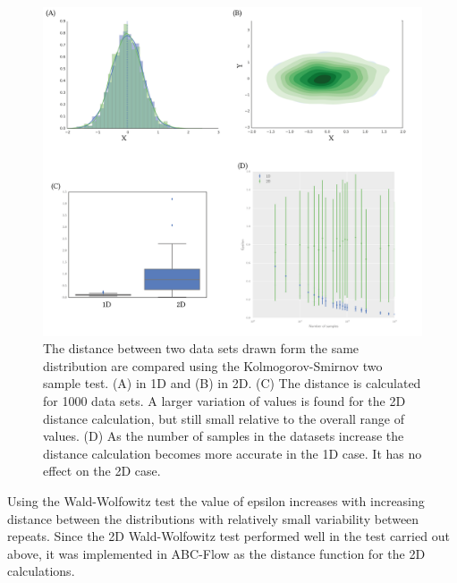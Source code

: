 \begin{figure}[tb]
\centering
\includegraphics[scale=0.7]{../../chapters/chapterABCFlow/images/epsilon_same_box.png}
\caption[LoF caption]{\label{fig:epsilon_boxplt}The distance between two data sets drawn form the same distribution are compared using the Kolmogorov-Smirnov two sample test. (A) in 1D and (B) in 2D. (C) The distance is calculated for 1000 data sets. A larger variation of values is found for the 2D distance calculation, but still small relative to the overall range of values. (D) As the number of samples in the datasets increase the distance calculation becomes more accurate in the 1D case. It has no effect on the 2D case.}
\end{figure}


Using the Wald-Wolfowitz test the value of epsilon increases with increasing distance between the distributions with relatively small variability between repeats. Since the 2D Wald-Wolfowitz test performed well in the test carried out above, it was implemented in ABC-Flow as the distance function for the 2D calculations.


